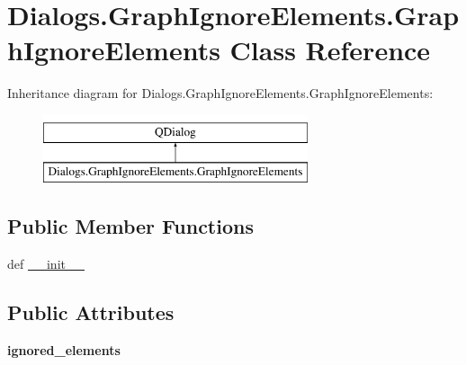 \hypertarget{classDialogs_1_1GraphIgnoreElements_1_1GraphIgnoreElements}{\section{Dialogs.\-Graph\-Ignore\-Elements.\-Graph\-Ignore\-Elements Class Reference}
\label{classDialogs_1_1GraphIgnoreElements_1_1GraphIgnoreElements}
}
Inheritance diagram for Dialogs.\-Graph\-Ignore\-Elements.\-Graph\-Ignore\-Elements\-:\begin{figure}[H]
\begin{center}
\leavevmode
\includegraphics[height=2.000000cm]{classDialogs_1_1GraphIgnoreElements_1_1GraphIgnoreElements}
\end{center}
\end{figure}
\subsection*{Public Member Functions}
\begin{DoxyCompactItemize}
\item 
def \hyperlink{classDialogs_1_1GraphIgnoreElements_1_1GraphIgnoreElements_a0c77514d612b59ba6295debed0d3664b}{\-\_\-\-\_\-init\-\_\-\-\_\-}
\end{DoxyCompactItemize}
\subsection*{Public Attributes}
\begin{DoxyCompactItemize}
\item 
\hypertarget{classDialogs_1_1GraphIgnoreElements_1_1GraphIgnoreElements_ab510440fc16701b8f73387c5ad903235}{{\bfseries ignored\-\_\-elements}}\label{classDialogs_1_1GraphIgnoreElements_1_1GraphIgnoreElements_ab510440fc16701b8f73387c5ad903235}

\end{DoxyCompactItemize}


